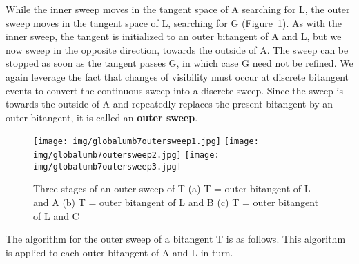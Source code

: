 \documentclass[9pt,twocolumn]{article}
\begin{document}
While the inner sweep moves in the tangent space of A searching for L,
the outer sweep moves in the tangent space of L, searching for G
(Figure~\ref{fig:outersweep}).
As with the inner sweep, the tangent is initialized to an outer bitangent of A and L,
but we now sweep in the opposite direction, towards the outside of A.
The sweep can be stopped as soon as the tangent passes G,
in which case G need not be refined.
We again leverage the fact that changes of visibility
must occur at discrete bitangent events to convert the continuous sweep into a discrete sweep.
Since the sweep is towards the outside of A and repeatedly
replaces the present bitangent by an outer bitangent,
it is called an {\bf outer sweep}.



\begin{figure}
\begin{center}
\texttt{[image: img/globalumb7outersweep1.jpg]}
\texttt{[image: img/globalumb7outersweep2.jpg]}
\texttt{[image: img/globalumb7outersweep3.jpg]}
\end{center}
\caption{Three stages of an outer sweep of T 
         (a) T = outer bitangent of L and A
	 (b) T = outer bitangent of L and B
	 (c) T = outer bitangent of L and C}
\label{fig:outersweep}
\end{figure}

The algorithm for the outer sweep of a bitangent T is as follows.
This algorithm is applied to each outer bitangent of A and L in turn.

\end{document}
